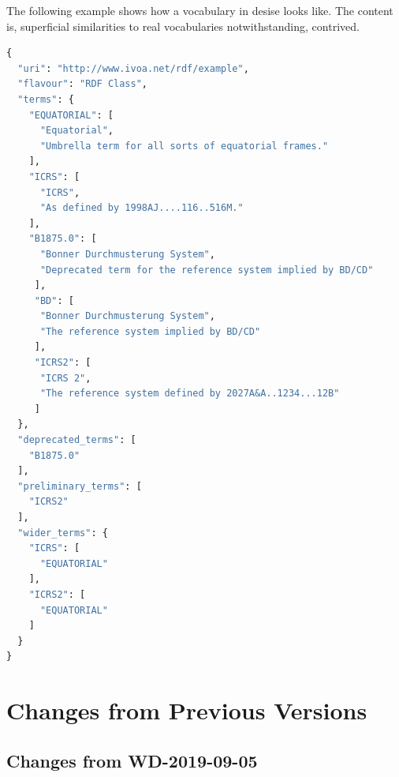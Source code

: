 \documentclass[11pt,a4paper]{ivoa}
\begin{document}
The following example shows how a vocabulary in desise looks like.  The
content is, superficial similarities to real vocabularies
notwithstanding, contrived.

\begin{lstlisting}[language=python]
{
  "uri": "http://www.ivoa.net/rdf/example",
  "flavour": "RDF Class",
  "terms": {
    "EQUATORIAL": [
      "Equatorial",
      "Umbrella term for all sorts of equatorial frames."
    ],
    "ICRS": [
      "ICRS",
      "As defined by 1998AJ....116..516M."
    ],
    "B1875.0": [
      "Bonner Durchmusterung System",
      "Deprecated term for the reference system implied by BD/CD"
     ],
     "BD": [
      "Bonner Durchmusterung System",
      "The reference system implied by BD/CD"
     ],
     "ICRS2": [
      "ICRS 2",
      "The reference system defined by 2027A&A..1234...12B"
     ]
  },
  "deprecated_terms": [
    "B1875.0"
  ],
  "preliminary_terms": [
    "ICRS2"
  ],
  "wider_terms": {
    "ICRS": [
      "EQUATORIAL"
    ],
    "ICRS2": [
      "EQUATORIAL"
    ]
  }
}
\end{lstlisting}

\section{Changes from Previous Versions}

\subsection{Changes from WD-2019-09-05}
\end{document}
